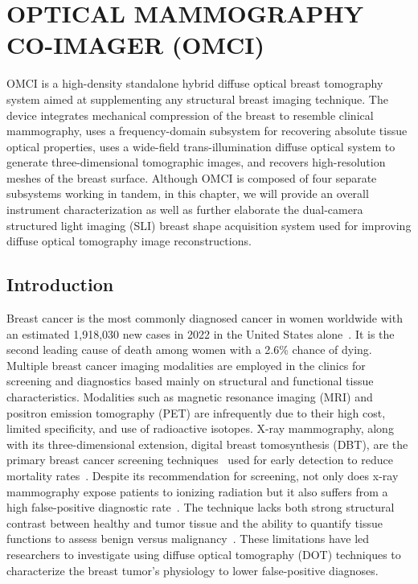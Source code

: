 
\chapter{OPTICAL MAMMOGRAPHY CO-IMAGER (OMCI)} %
\label{chap:omci}
OMCI is a high-density standalone hybrid diffuse optical breast tomography system aimed at supplementing any structural breast imaging technique. The device integrates mechanical compression of the breast to resemble clinical mammography, uses a frequency-domain subsystem for recovering absolute tissue optical properties, uses a wide-field trans-illumination diffuse optical system to generate three-dimensional tomographic images, and recovers high-resolution meshes of the breast surface. Although OMCI is composed of four separate subsystems working in tandem, in this chapter, we will provide an overall instrument characterization as well as further elaborate the dual-camera structured light imaging (SLI) breast shape acquisition system used for improving diffuse optical tomography image reconstructions.


\section{Introduction} %
\label{chap:omci:introduction}
Breast cancer is the most commonly diagnosed cancer in women worldwide with an estimated 1,918,030 new cases in 2022 in the United States alone~\cite{Siegel2022}. It is the second leading cause of death among women with a 2.6\% chance of dying. Multiple breast cancer imaging modalities are employed in the clinics for screening and diagnostics based mainly on structural and functional tissue characteristics. 
Modalities such as magnetic resonance imaging (MRI) and positron emission tomography (PET) are infrequently due to their high cost, limited specificity, and use of radioactive isotopes. X-ray mammography, along with its three-dimensional extension, digital breast tomosynthesis (DBT), are the primary breast cancer screening techniques~\cite{Secretan2015} used for early detection to reduce mortality rates~\cite{Tabar2003}. Despite its recommendation for screening, not only does x-ray mammography expose patients to ionizing radiation but it also suffers from a high false-positive diagnostic rate~\cite{Tabar2003, Elmore1998}. The technique lacks both strong structural contrast between healthy and tumor tissue and the ability to quantify tissue functions to assess benign versus malignancy~\cite{Leff2008}. These limitations have led researchers to investigate using diffuse optical tomography (DOT) techniques to characterize the breast tumor's physiology to lower false-positive diagnoses. 

